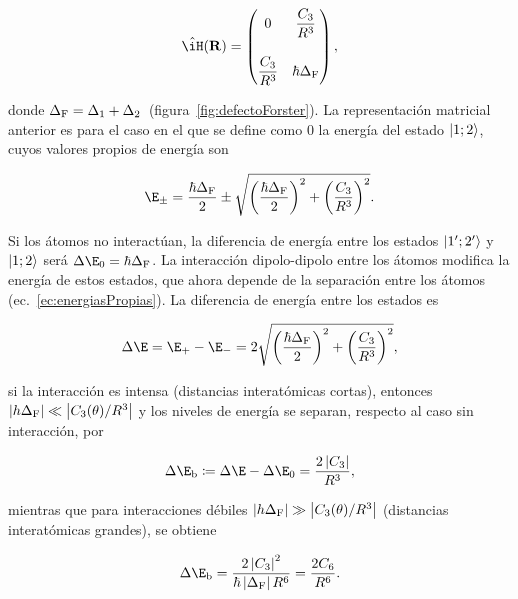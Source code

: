 \begin{equation}
\label{ec:hamiltonianoCompleto}
\hat{\iH}(\vektor{R})=\begin{pmatrix}
0 & \dfrac{C_\sm{3}}{R^{3}}\\[6mm]
\dfrac{C_\sm{3}}{R^{3}} & \hbar\Delta_\sm{\text{F}}
\end{pmatrix},
\end{equation}

donde $\Delta_{\text{F}}=\Delta_{1}+\Delta_{2}$~(figura~\ref{fig:defectoForster}). La representación matricial anterior es para el caso en el que se define como 0 la energía del estado $\ket{1;2}$, cuyos valores propios de energía son

\begin{equation}
\label{ec:energiasPropias}
\E_\sm{\pm}=\frac{\hbar\Delta_\sm{\text{F}}}{2}\pm\sqrt{\left(\frac{\hbar\Delta_\sm{\text{F}}}{2}\right)^{2}+\left(\frac{C_\sm{3}}{R^{3}}\right)^{2}}.
\end{equation}

Si los átomos no interactúan, la diferencia de energía entre los estados $\ket{1';2'}$ y $\ket{1;2}$ será $\Delta\E_\sm{0}=\hbar\Delta_\sm{\text{F}}$. La interacción dipolo-dipolo entre los átomos modifica la energía de estos estados, que ahora depende de la separación entre los átomos (ec.~\ref{ec:energiasPropias}). La diferencia de energía entre los estados es

\begin{equation}
\label{ec:diferenciaEnergia}
\Delta\E=\E_\sm{+}-\E_\sm{-}=2\sqrt{\left(\frac{\hbar\Delta_\sm{\text{F}}}{2}\right)^{2}+\left(\frac{C_\sm{3}}{R^{3}}\right)^{2}},
\end{equation}

si la interacción es intensa (distancias interatómicas cortas), entonces $\left|h\Delta_{\text{F}}\right|\ll\left|C_{3}(\theta)/R^{3}\right|$ y los niveles de energía se separan, respecto al caso sin interacción, por

\begin{equation}
\label{ec:diferenciaEnergiasCercano}
\Delta\E_\sm{\text{b}}\coloneqq\Delta\E-\Delta\E_\sm{0}=\frac{2\abs{C_\sm{3}}}{R^{3}},
\end{equation}

mientras que para interacciones débiles $\left|h\Delta_{\text{F}}\right|\gg\left|C_{3}(\theta)/R^{3}\right|$ (distancias interatómicas grandes), se obtiene

\begin{equation}
\label{ec:diferenciaEnergiasLejano}
\Delta\E_\sm{\text{b}}=\frac{2\abs{C_\sm{3}}^{2}}{\hbar\abs{\Delta_{\text{F}}}R^{6}}=\frac{2C_\sm{6}}{R^{6}}.
\end{equation}

